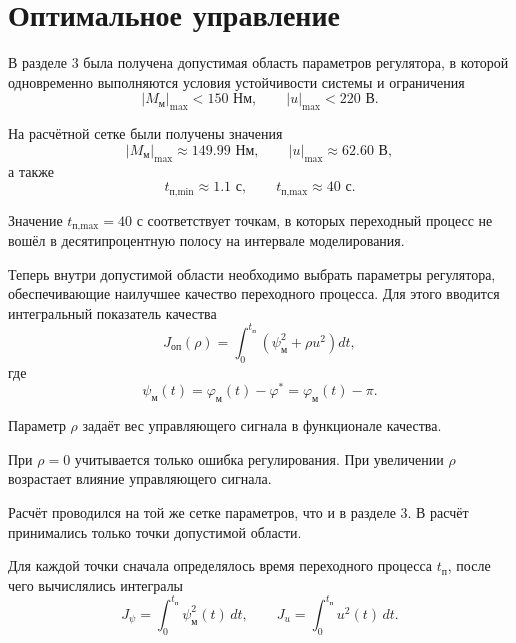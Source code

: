 \section{Оптимальное управление}

В разделе 3 была получена допустимая область параметров регулятора, в которой одновременно выполняются условия устойчивости системы и ограничения
\begin{equation}
|M_{\text{м}}|_{\max} < 150 \text{ Нм},
\qquad
|u|_{\max} < 220 \text{ В}.
\end{equation}

На расчётной сетке были получены значения
\begin{equation}
|M_{\text{м}}|_{\max} \approx 149.99 \text{ Нм},
\qquad
|u|_{\max} \approx 62.60 \text{ В},
\end{equation}
а также
\begin{equation}
t_{\text{п,min}} \approx 1.1 \text{ с},
\qquad
t_{\text{п,max}} \approx 40 \text{ с}.
\end{equation}

Значение \(t_{\text{п,max}} = 40\) с соответствует точкам, в которых переходный процесс не вошёл в десятипроцентную полосу на интервале моделирования.

Теперь внутри допустимой области необходимо выбрать параметры регулятора, обеспечивающие наилучшее качество переходного процесса. Для этого вводится интегральный показатель качества
\begin{equation}
J_{\text{оп}}(\rho)
=
\int_0^{t_{\text{п}}}
\left(
\psi_{\text{м}}^2
+
\rho u^2
\right)dt,
\end{equation}
где
\begin{equation}
\psi_{\text{м}}(t)
=
\varphi_{\text{м}}(t)-\varphi^*
=
\varphi_{\text{м}}(t)-\pi.
\end{equation}

Параметр \(\rho\) задаёт вес управляющего сигнала в функционале качества.

При \(\rho=0\) учитывается только ошибка регулирования. При увеличении \(\rho\) возрастает влияние управляющего сигнала.

Расчёт проводился на той же сетке параметров, что и в разделе 3. В расчёт принимались только точки допустимой области.

Для каждой точки сначала определялось время переходного процесса \(t_{\text{п}}\), после чего вычислялись интегралы
\begin{equation}
J_{\psi}
=
\int_0^{t_{\text{п}}}
\psi_{\text{м}}^2(t)\,dt,
\qquad
J_u
=
\int_0^{t_{\text{п}}}
u^2(t)\,dt.
\end{equation}


